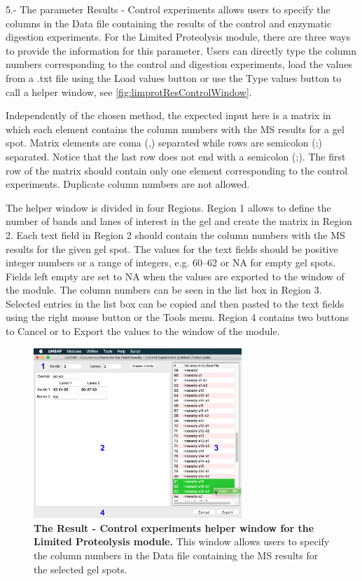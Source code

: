 \num{5}.- \label{par:limprotResultControl}The parameter Results - Control experiments allows users to specify the columns in the Data file containing the results of the control and enzymatic digestion experiments. For the Limited Proteolysis module, there are three ways to provide the information for this parameter. Users can directly type the column numbers corresponding to the control and digestion experiments, load the values from a .txt file using the Load values button or use the Type values button to call a helper window, see \autoref{fig:limprotResControlWindow}. 

Independently of the chosen method, the expected input here is a matrix in which each element contains the column numbers with the MS results for a gel spot. Matrix elements are coma (,) separated while rows are semicolon (;) separated. Notice that the last row does not end with a semicolon (;). The first row of the matrix should contain only one element corresponding to the control experiments. Duplicate column numbers are not allowed. 

The helper window is divided in four Regions. Region \num{1} allows to define the number of bands and lanes of interest in the gel and create the matrix in Region \num{2}. Each text field in Region \num{2} should contain the column numbers with the MS results for the given gel spot. The values for the text fields should be positive integer numbers or a range of integers, e.g. \numrange[range-phrase=--]{60}{62} or NA for empty gel spots. Fields left empty are set to NA when the values are exported to the window of the module. The column numbers can be seen in the list box in Region \num{3}. Selected entries in the list box can be copied and then pasted to the text fields using the right mouse button or the Tools menu. Region \num{4} contains two buttons to Cancel or to Export the values to the window of the module. 

\begin{figure}[h]
	\centering
	\includegraphics[width=0.7\textwidth]{./IMAGES/MOD-LIMPROT/limprot-rescontrol.jpg}
	\caption[The Result - Control experiments helper window for the Limited Proteolysis module]{\textbf{The Result - Control experiments helper window for the Limited Proteolysis module.} This window allows users to specify the column numbers in the Data file containing the MS results for the selected gel spots.} 
	\label{fig:limprotResControlWindow}
	\vspace{-5pt} 	
\end{figure}

